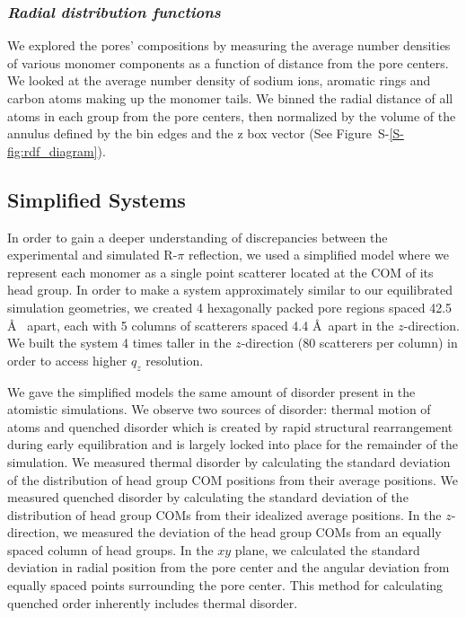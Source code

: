 \documentclass[journal=jpcbfk,manuscript=article]{achemso}
\begin{document}
  
  \subsubsection{\textit{Radial distribution functions}}

  We explored the pores' compositions by measuring the average number densities
  of various monomer components as a function of distance from the pore centers.
  We looked at the average number density of sodium ions, aromatic rings and 
  carbon atoms making up the monomer tails. We binned the radial distance of all
  atoms in each group from the pore centers, then normalized by the volume of the
  annulus defined by the bin edges and the z box vector (See Figure~S-\ref{S-fig:rdf_diagram}). 

  \subsection{Simplified Systems}\label{method:simple_systems}
  
  In order to gain a deeper understanding of discrepancies between the experimental and
  simulated R-$\pi$ reflection, we used a simplified model where we 
  represent each monomer as a single point scatterer located at the COM
  of its head group. In order to make a system approximately similar to our equilibrated 
  simulation geometries, we created 4 hexagonally packed pore regions spaced 42.5 \AA~
  apart, each with 5 columns of scatterers spaced 4.4 \AA~apart in the $z$-direction. We
  built the system 4 times taller in the $z$-direction (80 scatterers per column) in order
  to access higher $q_z$ resolution.
  
  We gave the simplified models the same amount of disorder present in the atomistic
  simulations. We observe two sources of disorder: thermal motion of atoms
  and quenched disorder which is created by rapid structural rearrangement during 
  early equilibration and is largely locked into place for the remainder of the 
  simulation. We measured thermal disorder by calculating the standard deviation of 
  the distribution of head group COM positions from their average positions.
  We measured quenched disorder by calculating the standard deviation of the distribution
  of head group COMs from their idealized average positions. In the 
  $z$-direction, we measured the deviation of the head group COMs from an
  equally spaced column of head groups. In the $xy$ plane, we calculated the standard 
  deviation in radial position from the pore center and the angular deviation from 
  equally spaced points surrounding the pore center. This method for calculating 
  quenched order inherently includes thermal disorder. 
  
\end{document}
